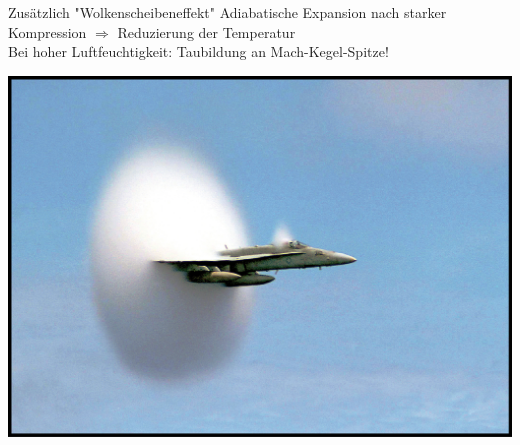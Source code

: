 Zusätzlich "Wolkenscheibeneffekt"
Adiabatische Expansion nach starker Kompression $ \Rightarrow $ Reduzierung der Temperatur\\
Bei hoher Luftfeuchtigkeit: Taubildung an Mach-Kegel-Spitze!
\begin{center}
	\includegraphics[width=0.5\linewidth]{skizzen/19/19B34}
\end{center}
